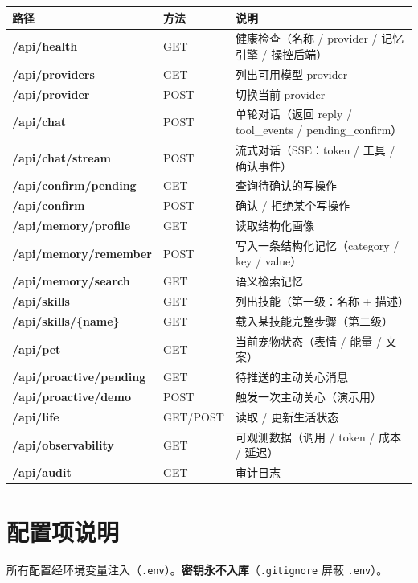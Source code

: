 {\small
\begin{xltabular}{\linewidth}{>{\bfseries\ttfamily\footnotesize}p{4.2cm} p{1.4cm} X}
\toprule
路径 & 方法 & 说明 \\
\midrule
\endhead
/api/health & GET & 健康检查（名称 / provider / 记忆引擎 / 操控后端） \\
/api/providers & GET & 列出可用模型 provider \\
/api/provider & POST & 切换当前 provider \\
/api/chat & POST & 单轮对话（返回 reply / tool\_events / pending\_confirm） \\
/api/chat/stream & POST & 流式对话（SSE：token / 工具 / 确认事件） \\
/api/confirm/pending & GET & 查询待确认的写操作 \\
/api/confirm & POST & 确认 / 拒绝某个写操作 \\
/api/memory/profile & GET & 读取结构化画像 \\
/api/memory/remember & POST & 写入一条结构化记忆（category / key / value） \\
/api/memory/search & GET & 语义检索记忆 \\
/api/skills & GET & 列出技能（第一级：名称 + 描述） \\
/api/skills/\{name\} & GET & 载入某技能完整步骤（第二级） \\
/api/pet & GET & 当前宠物状态（表情 / 能量 / 文案） \\
/api/proactive/pending & GET & 待推送的主动关心消息 \\
/api/proactive/demo & POST & 触发一次主动关心（演示用） \\
/api/life & GET/POST & 读取 / 更新生活状态 \\
/api/observability & GET & 可观测数据（调用 / token / 成本 / 延迟） \\
/api/audit & GET & 审计日志 \\
\bottomrule
\end{xltabular}}


\chapter{配置项说明}
\noindent 所有配置经环境变量注入（\texttt{.env}）。\textbf{密钥永不入库}（\texttt{.gitignore} 屏蔽 \texttt{.env}）。

